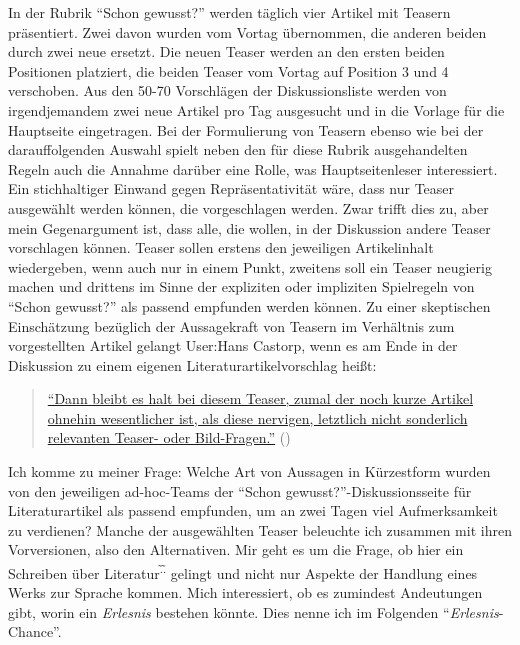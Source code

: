 \documentclass[fontsize=12pt]{scrartcl}
\begin{document}
In der Rubrik "`Schon gewusst?"' werden t\"aglich \mbox{vier} Artikel mit Teasern pr\"asentiert. Zwei davon wurden vom Vortag \"ubernommen, die anderen beiden durch zwei neue ersetzt. Die neuen Teaser werden an den ersten beiden Positionen platziert, die beiden Teaser vom Vortag auf Position 3 und 4 verschoben. Aus den 50-70 Vorschl\"agen der Dis\-kus\-si\-onsliste werden von irgendjemandem zwei neue Artikel pro Tag ausgesucht und in die Vorlage f\"ur die Hauptseite eingetragen. Bei der Formulierung von Teasern ebenso wie bei der darauffolgenden Auswahl spielt neben den f\"ur diese Rubrik ausgehandelten Regeln auch die Annahme dar\"uber eine Rolle, was Hauptsei\-tenleser\textsuperscript{\tiny *} interessiert. Ein stichhaltiger Einwand gegen Repr\"asentativit\"at w\"are, dass nur Teaser ausgew\"ahlt werden k\"onnen, die vorgeschlagen werden. Zwar trifft dies zu, aber mein Gegenargument ist, dass alle, die wollen, in der Dis\-kus\-si\-on andere Teaser vorschlagen k\"onnen. Teaser sollen erstens den jeweiligen Artikelinhalt wiedergeben, wenn auch nur in einem Punkt, zwei\-tens soll ein Teaser neugierig machen und drittens im Sinne der expliziten oder impliziten Spielregeln von "`Schon gewusst?"' als passend empfunden werden k\"onnen. Zu einer skeptischen Einsch\"atzung bez\"uglich der Aussagekraft von Teasern im Verh\"altnis zum vorgestellten Artikel gelangt \mbox{User}:Hans Castorp, wenn es am Ende in der Dis\-kus\-si\-on zu einem eigenen Li\-te\-ra\-tur\-artikelvorschlag hei{\ss}t: 

\singlespacing
\begin{quote}
\href{https://de.wikipedia.org/w/index.php?title=Wikipedia_Diskussion:Hauptseite/Schon_gewusst&diff=prev&oldid=130907996}{"`Dann bleibt es halt bei diesem Teaser, zumal der noch kurze Artikel ohnehin we\-sent\-licher ist, als diese nervigen, letzt\-lich nicht sonderlich re\-levanten Teaser- oder Bild-Fragen."'} (\cite{UserHansCastorp2014})
\end{quote}
\onehalfspacing

Ich komme zu meiner Frage: Welche Art von Aussagen in K\"urzestform wurden von den jeweiligen ad-hoc-Teams der "`Schon gewusst?"'-Dis\-kus\-si\-onsseite f\"ur Li\-te\-ra\-tur\-artikel als passend empfunden, um an zwei Tagen viel Aufmerksamkeit zu verdienen? Manche der ausgew\"ahlten Teaser beleuchte ich zusammen mit ihren Vorversionen, also den Alternativen. Mir geht es um die Frage, ob \mbox{hier} ein Schrei\-ben \"uber Li\-te\-ra\-tur\textsuperscript{\~.\~.} gelingt und nicht nur Aspekte der Handlung eines Werks zur Sprache kommen. Mich interessiert, ob es zumindest Andeutungen gibt, worin ein \textit{Erlesnis} bestehen k\"onnte. Dies nenne ich im Folgenden "`\textit{Erlesnis}-Chance"'.
\end{document}
